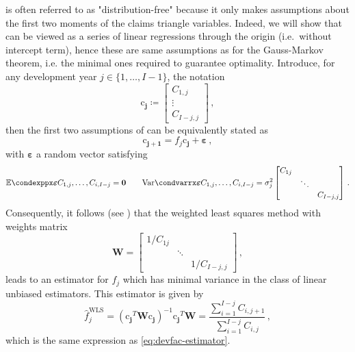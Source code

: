 \documentclass[a4paper]{book}
\begin{document}
 is often referred to as "distribution-free" because it only makes assumptions about the first two moments of the claims triangle variables. Indeed, we will show that  can be viewed as a series of linear regressions through the origin (i.e.\ without intercept term), hence these are same assumptions as for the Gauss-Markov theorem, i.e. the minimal ones required to guarantee optimality. Introduce, for any development year $j \in \{ 1, \dots, {I - 1} \}$, the notation
\begin{equation}
  \bm{\mathrm{c}_j} \coloneqq
  \begin{bmatrix}
    C_{1, j} \\
    \vdots   \\
    C_{I - j, j}
  \end{bmatrix} \,,
\end{equation}
then the first two assumptions of  can be equivalently stated as
\begin{equation}
  \bm{\mathrm{c}_{j + 1}} = f_j \bm{\mathrm{c}_j} + \bm{\varepsilon} \,,
\end{equation}
with $\bm{\varepsilon}$ a random vector satisfying
\begin{equation}
  \condexpp{\bm{\varepsilon}}{C_{1, j}, \dots, C_{i, I - j}} = \bm{0}
  \qquad%
  \condvarr{\bm{\varepsilon}}{C_{1, j}, \dots, C_{i, I - j}} = \sigma^2_j
  \begin{bmatrix}
    C_{1j} &        &              \\
           & \ddots &              \\
           &        & C_{I - j, j}
  \end{bmatrix} \,.
\end{equation}
Consequently, it follows (see \cite[Proposition 1.7]{hayashi}) that the weighted least squares method with weights matrix
\begin{equation}
  \mathbf{W} =
  \begin{bmatrix}
    1 / C_{1j} &        &                  \\
               & \ddots &                  \\
               &        & 1 / C_{I - j, j}
  \end{bmatrix} \,,
\end{equation}
leads to an estimator for $f_j$ which has minimal variance in the class of linear unbiased estimators. This estimator is given by
\begin{equation}
  \widehat{f}^{\mathrm{WLS}}_j = (\bm{\mathrm{c}_j}^T \mathbf{W} \bm{\mathrm{c}_j})^{-1} \bm{\mathrm{c}_j}^T \mathbf{W} = \frac{\sum_{i = 1}^{I - j} C_{i, j + 1}}{\sum_{i = 1}^{I - j} C_{i, j}} \,,
\end{equation}
which is the same expression as \cref{eq:devfac-estimator}.
\end{document}
